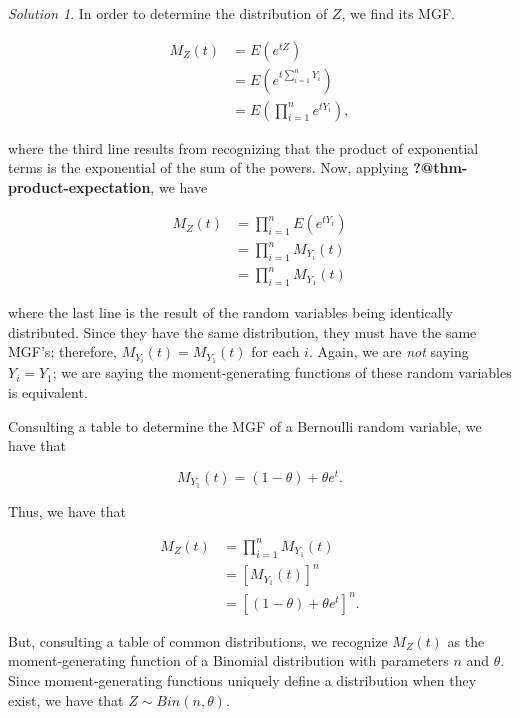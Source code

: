 \documentclass[
  letterpaper,
  DIV=11,
  numbers=noendperiod]{scrreprt}
\theoremstyle{definition}
\theoremstyle{definition}
\theoremstyle{plain}
\theoremstyle{remark}
\newtheorem*{solution}{Solution}
\begin{document}
\begin{solution}

In order to determine the distribution of \(Z\), we find its MGF.

\[
\begin{aligned}
  M_Z(t)
    &= E\left(e^{tZ}\right) \\
    &= E\left(e^{t\sum_{i=1}^{n} Y_i}\right) \\
    &= E\left(\prod_{i=1}^{n} e^{tY_i}\right),
\end{aligned}
\]

where the third line results from recognizing that the product of
exponential terms is the exponential of the sum of the powers. Now,
applying \textbf{?@thm-product-expectation}, we have

\[
\begin{aligned}
  M_Z(t)
    &= \prod_{i=1}^{n} E\left(e^{tY_i}\right) \\
    &= \prod_{i=1}^{n} M_{Y_i}(t) \\
    &= \prod_{i=1}^{n} M_{Y_1}(t)
\end{aligned}
\]

where the last line is the result of the random variables being
identically distributed. Since they have the same distribution, they
must have the same MGF's; therefore, \(M_{Y_i}(t) = M_{Y_1}(t)\) for
each \(i\). Again, we are \emph{not} saying \(Y_i = Y_1\); we are saying
the moment-generating functions of these random variables is equivalent.

Consulting a table to determine the MGF of a Bernoulli random variable,
we have that

\[M_{Y_1}(t) = (1 - \theta) + \theta e^t.\]

Thus, we have that

\[
\begin{aligned}
  M_Z(t)
    &= \prod_{i=1}^{n} M_{Y_1}(t) \\
    &= \left[M_{Y_1}(t)\right]^n \\
    &= \left[(1 - \theta) + \theta e^{t}\right]^n.
\end{aligned}
\]

But, consulting a table of common distributions, we recognize \(M_Z(t)\)
as the moment-generating function of a Binomial distribution with
parameters \(n\) and \(\theta\). Since moment-generating functions
uniquely define a distribution when they exist, we have that
\(Z \sim Bin(n, \theta)\).

\end{solution}
\end{document}
